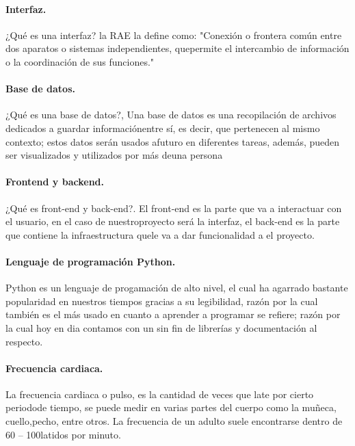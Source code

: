 \documentclass{report}
\begin{document}
		\paragraph{Interfaz.} ¿Qué es una interfaz? la RAE la define como: "Conexión o frontera común entre dos aparatos o sistemas independientes, quepermite el intercambio de información o la coordinación de sus funciones." \cite{rae_interfaz}
		\paragraph{Base de datos.} ¿Qué es una base de datos?, Una base de datos es una recopilación de archivos dedicados a guardar informaciónentre sí, es decir, que pertenecen al mismo contexto; estos datos serán usados afuturo en diferentes tareas, además, pueden ser visualizados y utilizados por más deuna persona \cite{BaseDDatos}
		\paragraph{Frontend y backend.} ¿Qué es front-end y back-end?. El front-end es la parte que va a interactuar con el usuario, en el caso de nuestroproyecto será la interfaz, el back-end es la parte que contiene la infraestructura quele va a dar funcionalidad a el proyecto. \cite{FrontendBackend}
		\paragraph{Lenguaje de programación Python.} Python es un lenguaje de progamación de alto nivel, el cual ha agarrado bastante popularidad en nuestros tiempos gracias a su legibilidad, razón por la cual también es el más usado en cuanto a aprender a programar se refiere; razón por la cual hoy en dia contamos con un sin fin de librerías y documentación al respecto. \cite{python3}
		\paragraph{Frecuencia cardiaca.} La frecuencia cardiaca o pulso, es la cantidad de veces que late por cierto periodode tiempo, se puede medir en varias partes del cuerpo como la muñeca, cuello,pecho, entre otros. La frecuencia de un adulto suele encontrarse dentro de 60 – 100latidos por minuto.\cite{FrecuenciaCardiaca}
			
\end{document}
